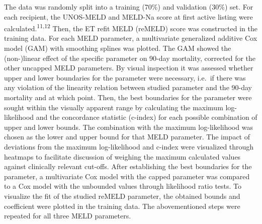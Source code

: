 \documentclass[11pt,english,]{book} %
\begin{document}
The data was randomly split into a training (70\%) and validation (30\%) set. For each recipient, the UNOS-MELD and MELD-Na score at first active listing were calculated.\textsuperscript{11,12} Then, the ET refit MELD (reMELD) score was constructed in the training data. For each MELD parameter, a multivariate generalized additive Cox model (GAM) with smoothing splines was plotted. The GAM showed the (non-)linear effect of the specific parameter on 90-day mortality, corrected for the other uncapped MELD parameters. By visual inspection it was assessed whether upper and lower boundaries for the parameter were necessary, i.e.~if there was any violation of the linearity relation between studied parameter and the 90-day mortality and at which point. Then, the best boundaries for the parameter were sought within the visually apparent range by calculating the maximum log-likelihood and the concordance statistic (c-index) for each possible combination of upper and lower bounds. The combination with the maximum log-likelihood was chosen as the lower and upper bound for that MELD parameter. The impact of deviations from the maximum log-likelihood and c-index were visualized through heatmaps to facilitate discussion of weighing the maximum calculated values against clinically relevant cut-offs. After establishing the best boundaries for the parameter, a multivariate Cox model with the capped parameter was compared to a Cox model with the unbounded values through likelihood ratio tests. To visualize the fit of the studied reMELD parameter, the obtained bounds and coefficient were plotted in the training data. The abovementioned steps were repeated for all three MELD parameters.
\end{document}
